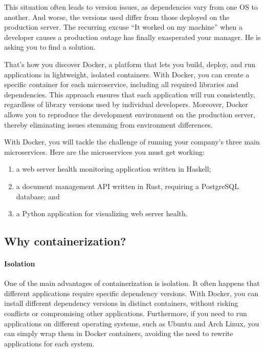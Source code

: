 \documentclass[french]{article}
\begin{document}
This situation often leads to version issues, as dependencies vary from one OS to another.
And worse, the versions used differ from those deployed on the production server.
The recurring excuse “It worked on my machine” when a developer causes a production outage has finally exasperated your manager. He is asking you to find a solution.

That’s how you discover Docker, a platform that lets you build, deploy, and run applications in lightweight, isolated containers.
With Docker, you can create a specific container for each microservice, including all required libraries and dependencies.
This approach ensures that each application will run consistently, regardless of library versions used by individual developers.
Moreover, Docker allows you to reproduce the development environment on the production server, thereby eliminating issues stemming from environment differences.

With Docker, you will tackle the challenge of running your company’s three main microservices.
Here are the microservices you must get working:

\begin{enumerate}
    \item a web server health monitoring application written in Haskell;
    \item a document management API written in Rust, requiring a PostgreSQL database; and
    \item a Python application for visualizing web server health.
\end{enumerate}

\subsection{Why containerization?}

\paragraph{Isolation}
One of the main advantages of containerization is isolation.
It often happens that different applications require specific dependency versions.
With Docker, you can install different dependency versions in distinct containers, without risking conflicts or compromising other applications.
Furthermore, if you need to run applications on different operating systems, such as Ubuntu and Arch Linux, you can simply wrap them in Docker containers, avoiding the need to rewrite applications for each system.
\end{document}
